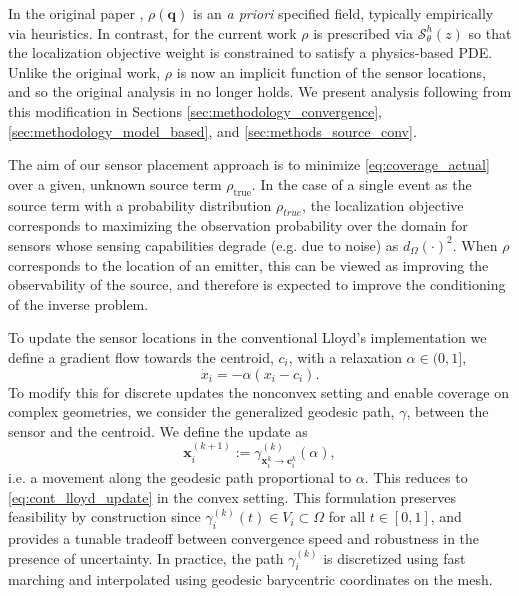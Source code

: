 \documentclass[onefignum,onetabnum]{siamart171218} %
\begin{document}
In the original paper \cite{cortes2004coverage}, $\rho(\mathbf{q})$ is an \emph{a priori} specified field, typically empirically via heuristics. In contrast, for the current work $\rho$ is prescribed via $\mathcal{S}^h_\theta(z)$ so that the localization objective weight is constrained to satisfy a physics-based PDE. Unlike the original work, $\rho$ is now an implicit function of the sensor locations, and so the original analysis in \cite{cortes2004coverage} no longer holds. We present analysis following from this modification in Sections \ref{sec:methodology_convergence}, \ref{sec:methodology_model_based}, and \ref{sec:methods_source_conv}.

The aim of our sensor placement approach is to minimize \eqref{eq:coverage_actual} over a given, unknown source term \(\rho_{\mathrm{true}}\).
In the case of a single event as the source term with a probability distribution \(\rho_{true}\), the localization objective corresponds to maximizing the observation probability over the domain for sensors whose sensing capabilities degrade (e.g. due to noise) as \(d_\Omega(\cdot)^2\). When \(\rho \) corresponds to the location of an emitter, this can be viewed as improving the observability of the source, and therefore is expected to improve the conditioning of the inverse problem.

To update the sensor locations in the conventional Lloyd's implementation we define a gradient flow towards the centroid, \(c_i\), with a relaxation \( \alpha \in (0,1] \), 
\begin{equation}
    \label{eq:cont_lloyd_update}
    \dot{x}_i = -\alpha(x_i-c_i).
\end{equation}
To modify this for discrete updates the nonconvex setting and enable coverage on complex geometries, we consider the generalized geodesic path, $\gamma$, between the sensor and the centroid.
We define the update as
\begin{equation}
    \label{eq:relaxed-update}
    \mathbf{x}_i^{(k+1)} := \gamma_{\mathbf{x}^k_i\to \mathbf{c}^k_i}^{(k)}(\alpha),
\end{equation}
i.e. a movement along the geodesic path proportional to $\alpha$. This reduces to \eqref{eq:cont_lloyd_update} in the convex setting.
\noindent This formulation preserves feasibility by construction since \( \gamma_i^{(k)}(t) \in V_i \subset \Omega \) for all \( t \in [0,1] \), and provides a tunable tradeoff between convergence speed and robustness in the presence of uncertainty. In practice, the path \( \gamma_i^{(k)} \) is discretized using fast marching and interpolated using geodesic barycentric coordinates on the mesh.
\end{document}
